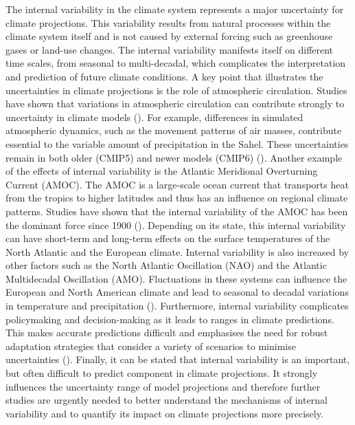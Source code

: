 \documentclass[
]{krantz}
\begin{document}
The internal variability in the climate system represents a major uncertainty for climate projections. This variability results from natural processes within the climate system itself and is not caused by external forcing such as greenhouse gases or land-use changes. The internal variability manifests itself on different time scales, from seasonal to multi-decadal, which complicates the interpretation and prediction of future climate conditions.
A key point that illustrates the uncertainties in climate projections is the role of atmospheric circulation. Studies have shown that variations in atmospheric circulation can contribute strongly to uncertainty in climate models (\citet{monerie2020model}). For example, differences in simulated atmospheric dynamics, such as the movement patterns of air masses, contribute essential to the variable amount of precipitation in the Sahel. These uncertainties remain in both older (CMIP5) and newer models (CMIP6) (\citet{monerie2020model}).
Another example of the effects of internal variability is the Atlantic Meridional Overturning Current (AMOC). The AMOC is a large-scale ocean current that transports heat from the tropics to higher latitudes and thus has an influence on regional climate patterns. Studies have shown that the internal variability of the AMOC has been the dominant force since 1900 (\citet{latif2022natural}). Depending on its state, this internal variability can have short-term and long-term effects on the surface temperatures of the North Atlantic and the European climate.
Internal variability is also increased by other factors such as the North Atlantic Oscillation (NAO) and the Atlantic Multidecadal Oscillation (AMO). Fluctuations in these systems can influence the European and North American climate and lead to seasonal to decadal variations in temperature and precipitation (\citet{latif2022natural}).
Furthermore, internal variability complicates policymaking and decision-making as it leads to ranges in climate predictions. This makes accurate predictions difficult and emphasises the need for robust adaptation strategies that consider a variety of scenarios to minimise uncertainties (\citet{tomassini2010uncertainty}).
Finally, it can be stated that internal variability is an important, but often difficult to predict component in climate projections. It strongly influences the uncertainty range of model projections and therefore further studies are urgently needed to better understand the mechanisms of internal variability and to quantify its impact on climate projections more precisely.
\end{document}
